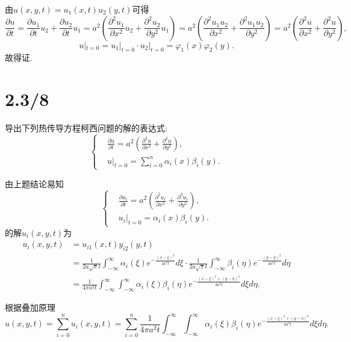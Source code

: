 \documentclass[11pt,a4paper]{article}
\begin{document}
由$u(x,y,t)=u_1(x,t)u_2(y,t)$可得
$$\frac{\partial u}{\partial t}=\frac{\partial u_1}{\partial t}u_2+\frac{\partial u_2}{\partial t}u_1=a^2\left(\frac{\partial^2u_1}{\partial x^2}u_2+\frac{\partial^2u_2}{\partial y^2}u_1\right)=a^2\left(\frac{\partial^2u_1u_2}{\partial x^2}+\frac{\partial^2u_1u_2}{\partial y^2}\right)=a^2\left(\frac{\partial^2u}{\partial x^2}+\frac{\partial^2u}{\partial y^2}\right),$$
$$u|_{t=0}=u_1|_{t=0}\cdot u_2|_{t=0}=\varphi_1(x)\varphi_2(y).$$
故得证.

\section{2.3/8}
\begin{problem}
导出下列热传导方程柯西问题的解的表达式:
$$\left\{\begin{aligned}
     & \frac{\partial u}{\partial t}=a^2\left(\frac{\partial^2u}{\partial x^2}+\frac{\partial^2u}{\partial y^2}\right), \\
     & u|_{t=0}=\sum_{i=0}^n\alpha_i(x)\beta_i(y).
  \end{aligned}\right.$$
\end{problem}

由上题结论易知
$$\left\{\begin{aligned}
     & \frac{\partial u_i}{\partial t}=a^2\left(\frac{\partial^2u_i}{\partial x^2}+\frac{\partial^2u_i}{\partial y^2}\right), \\
     & u_i|_{t=0}=\alpha_i(x)\beta_i(y).
  \end{aligned}\right.$$
的解$u_i(x,y,t)$为
\begin{align*}
  u_i(x,y,t)
   & =u_{i1}(x,t)y_{i2}(y,t)                                                                                                                    \\
   & =\frac{1}{2a\sqrt{\pi}t}\int_{-\infty}^\infty\alpha_i(\xi)e^{-\frac{(x-\xi)^2}{4a^2t}}d\xi
  \cdot\frac{1}{2a\sqrt{\pi}t}\int_{-\infty}^\infty\beta_i(\eta)e^{-\frac{(y-\eta)^2}{4a^2t}}d\eta                                              \\
   & =\frac{1}{4\pi a^2t}\int_{-\infty}^\infty\int_{-\infty}^\infty\alpha_i(\xi)\beta_i(\eta)e^{-\frac{(x-\xi)^2+(y-\eta)^2}{4a^2t}}d\xi d\eta.
\end{align*}

根据叠加原理
$$u(x,y,t)=\sum_{i=0}^n u_i(x,y,t)=\sum_{i=0}^n\frac{1}{4\pi a^2t}\int_{-\infty}^\infty\int_{-\infty}^\infty\alpha_i(\xi)\beta_i(\eta)e^{-\frac{(x-\xi)^2+(y-\eta)^2}{4a^2t}}d\xi d\eta.$$
\end{document}

